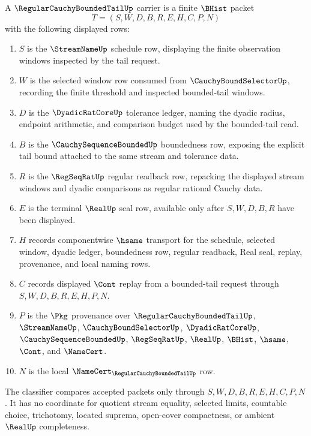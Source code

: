 \begin{definition}
\label{def:regular-cauchy-bounded-tail-carrier}
A $\RegularCauchyBoundedTailUp$ carrier is a finite $\BHist$ packet
$$
T=(S,W,D,B,R,E,H,C,P,N)
$$
with the following displayed rows:
\begin{enumerate}
\item $S$ is the $\StreamNameUp$ schedule row, displaying the finite observation windows inspected by the tail request.
\item $W$ is the selected window row consumed from $\CauchyBoundSelectorUp$, recording the finite threshold and inspected bounded-tail windows.
\item $D$ is the $\DyadicRatCoreUp$ tolerance ledger, naming the dyadic radius, endpoint arithmetic, and comparison budget used by the bounded-tail read.
\item $B$ is the $\CauchySequenceBoundedUp$ boundedness row, exposing the explicit tail bound attached to the same stream and tolerance data.
\item $R$ is the $\RegSeqRatUp$ regular readback row, repacking the displayed stream windows and dyadic comparisons as regular rational Cauchy data.
\item $E$ is the terminal $\RealUp$ seal row, available only after $S,W,D,B,R$ have been displayed.
\item $H$ records componentwise $\hsame$ transport for the schedule, selected window, dyadic ledger, boundedness row, regular readback, Real seal, replay, provenance, and local naming rows.
\item $C$ records displayed $\Cont$ replay from a bounded-tail request through $S,W,D,B,R,E,H,P,N$.
\item $P$ is the $\Pkg$ provenance over $\RegularCauchyBoundedTailUp$, $\StreamNameUp$, $\CauchyBoundSelectorUp$, $\DyadicRatCoreUp$, $\CauchySequenceBoundedUp$, $\RegSeqRatUp$, $\RealUp$, $\BHist$, $\hsame$, $\Cont$, and $\NameCert$.
\item $N$ is the local $\NameCert_{\RegularCauchyBoundedTailUp}$ row.
\end{enumerate}
The classifier compares accepted packets only through $S,W,D,B,R,E,H,C,P,N$. It has no coordinate for quotient stream equality, selected limits, countable choice, trichotomy, located suprema, open-cover compactness, or ambient $\RealUp$ completeness.
\end{definition}


